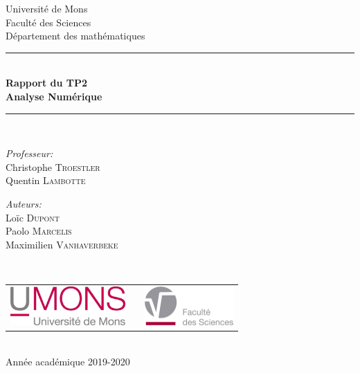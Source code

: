 \documentclass[a4paper, 10pt]{article}
\begin{document}
\begin{titlepage}
\begin{center}

{\Large Université de Mons}\\[1ex]
{\Large Faculté des Sciences}\\[1ex]
{\Large Département des mathématiques}\\[2.5cm]

\newcommand{\HRule}{\rule{\linewidth}{0.3mm}}
\HRule \\[0.3cm]
{ \LARGE \bfseries Rapport du TP2 \\[0.3cm]}
{ \LARGE \bfseries Analyse Numérique \\[0.1cm]}
\HRule \\[1.5cm]

\begin{minipage}[t]{0.45\textwidth}
\begin{flushleft} \large
\emph{Professeur:}\\
Christophe \textsc{Troestler} \\
Quentin \textsc{Lambotte}
\end{flushleft}
\end{minipage}
\begin{minipage}[t]{0.45\textwidth}
\begin{flushright} \large
\emph{Auteurs:} \\
Loïc \textsc{Dupont} \\
Paolo \textsc{Marcelis} \\
Maximilien \textsc{Vanhaverbeke}
\end{flushright}
\end{minipage}\\[2ex]

\vfill

\begin{center}
\begin{tabular}[t]{c c c}
\includegraphics[height=1.5cm]{logoumons.jpg} &
\hspace{0.3cm} &
\includegraphics[height=1.5cm]{logofs.jpg}
\end{tabular}
\end{center}~\\
 
{\large Année académique 2019-2020}

\end{center}
\end{titlepage}
\end{document}
